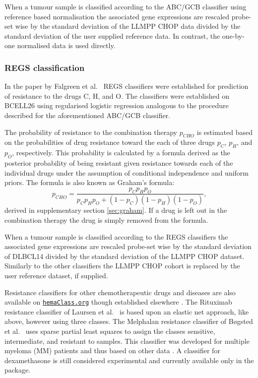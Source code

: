 \documentclass[twocolumn]{bmcart}%
\newcommand{\hemaClass}{\href{http://hemaClass.org}{\texttt{hemaClass.org}}}
\begin{document}
When a tumour sample is classified according to the ABC/GCB classifier using reference based normalisation the associated gene expressions are rescaled probe-set wise by the standard deviation of the LLMPP CHOP data divided by the standard deviation of the user supplied reference data.
In contrast, the one-by-one normalised data is used directly.



\subsubsection{REGS classification}
\label{sec:regsmethods}
In the paper by Falgreen et al.~\cite{Falgreen2015} REGS classifiers were established for prediction of resistance to the drugs C, H, and O.
The classifiers were established on BCELL26 using regularised logistic regression analogous to the procedure described for the aforementioned ABC/GCB classifier.

The probability of resistance to the combination therapy $p_{CHO}$ is estimated based on the probabilities of drug resistance toward the each of three drugs $p_C$, $p_H$, and $p_O$, respectively.
This probability is calculated by a formula derived as the posterior probability of being resistant given resistance towards each of the individual drugs under the assumption of conditional independence and uniform priors.
The formula is also known as Graham's formula:
\begin{equation*}
  p_{CHO} = \frac{p_C p_H p_O}{p_C p_H p_O + (1 - p_C)(1 - p_H)(1 - p_O)},
\end{equation*}
derived in supplementary section \ref{sec:graham}.
If a drug is left out in the combination therapy the drug is simply removed from the formula.

When a tumour sample is classified according to the REGS classifiers the associated gene expressions are rescaled probe-set wise by the standard deviation of DLBCL14 divided by the standard deviation of the LLMPP CHOP dataset.
Similarly to the other classifiers the LLMPP CHOP cohort is replaced by the user reference dataset, if supplied.

Resistance classifiers for other chemotherapeutic drugs and diseases are also available on \hemaClass{} though established elsewhere \cite{Boegsted2011,Bogsted2013,Laursen2014}.
The Rituximab resistance classifier of Laursen et al.~\cite{Laursen2014} is based upon an elastic net approach, like above, however using three classes.
The Melphalan resistance classifier of B{\o}gsted et al.~\cite{Boegsted2011} uses sparse partial least squares to assign the classes sensitive, intermediate, and resistant to samples.
This classifier was developed for multiple myeloma (MM) patients and thus based on other data \cite{Boegsted2011}.
A classifier for dexamethasone is still considered experimental and currently available only in the package.
\end{document}
